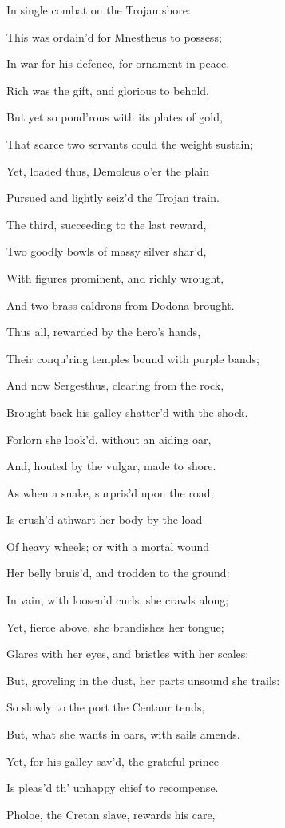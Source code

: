 In single combat on the Trojan shore:

This was ordain’d for Mnestheus to possess;

In war for his defence, for ornament in peace.

Rich was the gift, and glorious to behold,

But yet so pond’rous with its plates of gold,

That scarce two servants could the weight sustain;

Yet, loaded thus, Demoleus o’er the plain

Pursued and lightly seiz’d the Trojan train.

The third, succeeding to the last reward,

Two goodly bowls of massy silver shar’d,

With figures prominent, and richly wrought,

And two brass caldrons from Dodona brought.

Thus all, rewarded by the hero’s hands,

Their conqu’ring temples bound with purple bands;

And now Sergesthus, clearing from the rock,

Brought back his galley shatter’d with the shock.

Forlorn she look’d, without an aiding oar,

And, houted by the vulgar, made to shore.

As when a snake, surpris’d upon the road,

Is crush’d athwart her body by the load

Of heavy wheels; or with a mortal wound

Her belly bruis’d, and trodden to the ground:

In vain, with loosen’d curls, she crawls along;

Yet, fierce above, she brandishes her tongue;

Glares with her eyes, and bristles with her scales;

But, groveling in the dust, her parts unsound she trails:

So slowly to the port the Centaur tends,

But, what she wants in oars, with sails amends.

Yet, for his galley sav’d, the grateful prince

Is pleas’d th’ unhappy chief to recompense.

Pholoe, the Cretan slave, rewards his care,

